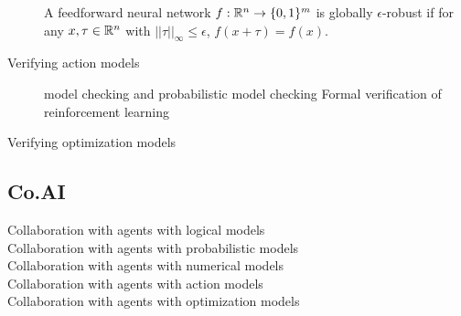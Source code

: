 \begin{description}
   A feedforward neural network $f:\mathbb{R}^n\rightarrow \{0,1\}^m$ is
   globally $\epsilon$-robust if for any $x,\tau\in\mathbb{R}^n$ with
   $||\tau||_{\infty} \leq \epsilon$, $f(x+\tau)=f(x)$. 
   
 \item[Verifying action models]
   model checking \cite{clarke2018introduction} and
   probabilistic model checking \cite{kwiatkowska2018probabilistic}
   Formal verification of reinforcement learning
   \cite{van2017challenges}
   
 \item[Verifying optimization models]
   
\end{description}

\subsection{Co.AI}
\begin{description}
\item[Collaboration with agents with logical models]
\item[Collaboration with agents with probabilistic models]
\item[Collaboration with agents with numerical models]
\item[Collaboration with agents with action models]
\item[Collaboration with agents with optimization models]    
\end{description}
